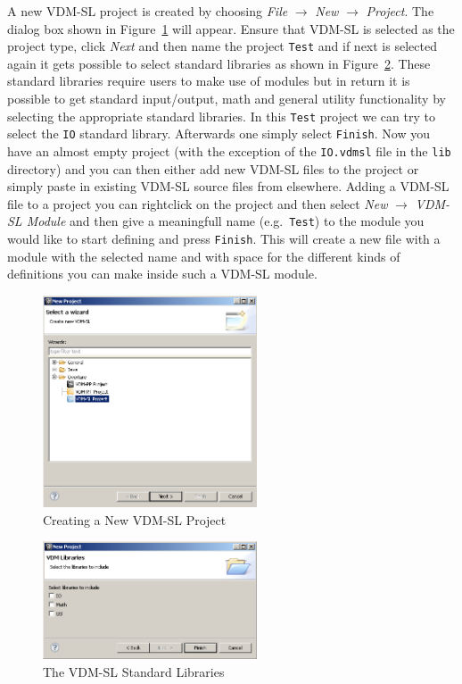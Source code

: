 A new VDM-SL project is created by choosing \emph{File} $ \rightarrow$
\emph{New} $\rightarrow$ \emph{Project}. The dialog box shown in
Figure~\ref{fig:newOvertureProjectSL} will appear. Ensure that VDM-SL
is selected as the project type, click \emph{Next} and then name the
project \texttt{Test} and if next is selected again it gets possible
to select standard libraries as shown in
Figure~\ref{fig:stdlibs}. These standard libraries require users to
make use of modules but in return it is possible to get standard
input/output, math and general utility functionality by selecting the
appropriate standard libraries. In this \texttt{Test} project we can
try to select the \texttt{IO} standard library. Afterwards one simply
select \texttt{Finish}. Now you have an almost empty project (with the
exception of the \texttt{IO.vdmsl} file in the \texttt{lib} directory)
and you can then
either add new VDM-SL files to the project or simply paste in existing
VDM-SL source files from elsewhere. Adding a VDM-SL file to a project
you can rightclick on the project and then select \emph{New}
$\rightarrow$ \emph{VDM-SL Module} and then give a meaningfull name
(e.g.\ \texttt{Test}) to
the module you would like to start defining and press
\texttt{Finish}. This will create a new file with a module with the
selected name and with space for the different kinds of definitions
you can make inside such a VDM-SL module.

\begin{figure}[!htb]
\begin{center}
  \includegraphics[width=2.5in]{figures/newovertureSLproject}
  \caption[labelInTOC]{Creating a New VDM-SL Project}
  \label{fig:newOvertureProjectSL}
\end{center}
\end{figure}

\begin{figure}[!htb]
\begin{center}
  \includegraphics[width=2.5in]{figures/stdlibs}
  \caption[labelInTOC]{The VDM-SL Standard Libraries}
  \label{fig:stdlibs}
\end{center}
\end{figure}

